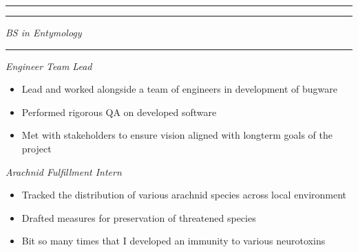 \documentclass[a4paper, 12pt]{article}
\begin{document}
\begin{flushright}
\end{flushright}
\vspace{-40pt}
\begin{flushleft}
\noindent\rule{\textwidth}{0.4pt}
\end{flushleft}
\begin{flushleft}
\newline
\end{flushleft}
\begin{flushleft}
\noindent\rule{\textwidth}{0.4pt}
\end{flushleft}
\begin{flushleft}
\newline
\textit{BS in Entymology}
\end{flushleft}
\begin{flushleft}
\noindent\rule{\textwidth}{0.4pt}
\end{flushleft}
\begin{flushleft}
\newline
\textit{Engineer Team Lead}
\begin{itemize}
\item Lead and worked alongside a team of engineers in development of bugware
\item Performed rigorous QA on developed software
\item Met with stakeholders to ensure vision aligned with longterm goals of the project
\end{itemize}
\end{flushleft}
\begin{flushleft}
\newline
\textit{Arachnid Fulfillment Intern}
\begin{itemize}
\item Tracked the distribution of various arachnid species across local environment
\item Drafted measures for preservation of threatened species
\item Bit so many times that I developed an immunity to various neurotoxins
\end{itemize}
\end{flushleft}
\end{document}

